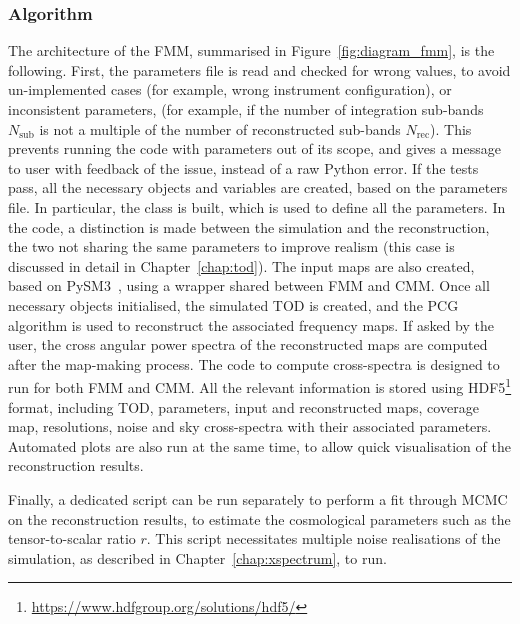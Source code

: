 \documentclass[../../thesis.tex]{subfiles}
\begin{document}
\subsubsection{Algorithm}

The architecture of the FMM, summarised in Figure~\ref{fig:diagram_fmm}, is the following. First, the parameters file is read and checked for wrong values, to avoid un-implemented cases (for example, wrong instrument configuration), or inconsistent parameters, (for example, if the number of integration sub-bands $N_{\text{sub}}$ is not a multiple of the number of reconstructed sub-bands $N_{\text{rec}}$). This prevents running the code with parameters out of its scope, and gives a message to user with feedback of the issue, instead of a raw Python error.
If the tests pass, all the necessary objects and variables are created, based on the parameters file. In particular, the class \texttt{} is built, which is used to define all the parameters. In the code, a distinction is made between the simulation and the reconstruction, the two not sharing the same parameters to improve realism (this case is discussed in detail in Chapter~\ref{chap:tod}). The input maps are also created, based on PySM3~\cite{PySM}, using a wrapper shared between FMM and CMM.
Once all necessary objects initialised, the simulated TOD is created, and the PCG algorithm is used to reconstruct the associated frequency maps. If asked by the user, the cross angular power spectra of the reconstructed maps are computed after the map-making process. The code to compute cross-spectra is designed to run for both FMM and CMM.
All the relevant information is stored using HDF5\footnote{\url{https://www.hdfgroup.org/solutions/hdf5/}} format, including TOD, parameters, input and reconstructed maps, coverage map, resolutions, noise and sky cross-spectra with their associated parameters. 
Automated plots are also run at the same time, to allow quick visualisation of the reconstruction results.

Finally, a dedicated script can be run separately to perform a fit through MCMC on the reconstruction results, to estimate the cosmological parameters such as the tensor-to-scalar ratio $r$. This script necessitates multiple noise realisations of the simulation, as described in Chapter~\ref{chap:xspectrum}, to run.
\end{document}
